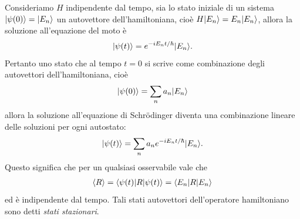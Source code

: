 Consideriamo $ H $ indipendente dal tempo, sia lo stato iniziale di un sistema $ \vert \psi(0) \rangle = \vert E_n \rangle $ un autovettore dell'hamiltoniana, cioè 
$ H\vert E_n \rangle = E_n \vert E_n \rangle $, allora la soluzione all'equazione del moto è 
\begin{align*}
  \vert \psi(t) \rangle = e^{-i E_n t/\hbar} \vert E_n \rangle.
\end{align*}
Pertanto uno stato che al tempo $ t = 0 $ si scrive come combinazione degli autovettori dell'hamiltoniana, cioè 
\begin{align*}
  \vert \psi(0) \rangle = \sum_n a_n \vert E_n \rangle
\end{align*}
allora la soluzione all'equazione di Schrödinger diventa una combinazione lineare delle soluzioni per ogni autostato:
\begin{align*}
  \vert \psi(t) \rangle = \sum_n a_n e^{- i E_n t /\hbar} \vert E_n \rangle.
\end{align*}
Questo significa che per un qualsiasi osservabile vale che 
\begin{align*}
  \langle R \rangle = \langle \psi(t) | R | \psi(t) \rangle = \langle  E_n | R | E_n \rangle
\end{align*}
ed è indipendente dal tempo. Tali stati autovettori dell'operatore hamiltoniano sono detti \textit{stati stazionari}.

